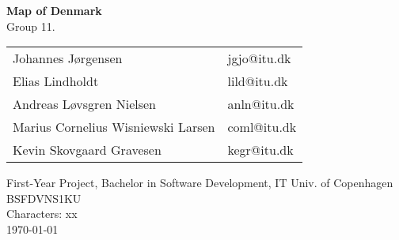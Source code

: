 \documentclass[a4paper,12pt]{article}
\begin{document}
\begin{center}
    \huge{\textbf{Map of Denmark}}\\
    \Large{Group 11.}\\
  \end{center}
  \begin{center}
    \begin{tabular}{p{2.85in}|p{2.85in}}
      Johannes Jørgensen & jgjo@itu.dk  \\   
      Elias Lindholdt & lild@itu.dk  \\
      Andreas Løvsgren Nielsen & anln@itu.dk\\
      Marius Cornelius Wisniewski Larsen & coml@itu.dk \\
      Kevin Skovgaard Gravesen & kegr@itu.dk \\    
      \hline
    \end{tabular}
  \end{center}
  \vspace{0.5cm}
  \begin{center}
    \vspace{0.5cm}
    First-Year Project, Bachelor in Software Development, IT Univ. of Copenhagen\\
    BSFDVNS1KU\\
    \vspace{0.5cm}
    Characters: xx \\
    \today
  \end{center}
\newpage
\pagestyle{fancy}
\fancyhead{} %
\fancyfoot{} %
\fancyfoot[LE,RO]{\thepage}
\renewcommand*\contentsname{Table of Contents}
\tableofcontents
\newpage



\printbibliography[title={References}]
\end{document}
